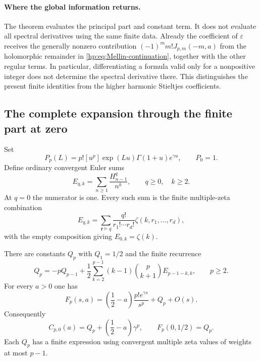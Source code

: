 \paragraph{Where the global information returns.}
The theorem evaluates the principal part and constant term. It does
not evaluate all spectral derivatives using the same finite data.
Already the coefficient of $\varepsilon$ receives the generally nonzero
contribution $(-1)^m m!J_{p,m}(-m,a)$ from the holomorphic remainder
in \eqref{hp:eq:Mellin-continuation}, together with the other regular
terms. In particular, differentiating a formula valid only for a
nonpositive integer does not determine the spectral derivative there.
This distinguishes the present finite identities from the higher
harmonic Stieltjes coefficients.

\subsection{The complete expansion through the finite part at zero}

Set
\begin{equation}\label{hp:def:P}
 P_p(L)=p![u^p]\exp(Lu)\Gamma(1+u)e^{\gamma u},\qquad P_0=1.
\end{equation}
Define ordinary convergent Euler sums
\begin{equation}\label{hp:def:E}
 E_{q,k}=\sum_{n\ge1}\frac{H_{n-1}^q}{n^k},
 \qquad q\ge0,\quad k\ge2.
\end{equation}
At $q=0$ the numerator is one. Every such sum is the finite
multiple-zeta combination
\begin{equation}\label{hp:eq:E-MZV}
 E_{q,k}=\sum_{\boldsymbol{r}\vDash q}
       \frac{q!}{r_1!\cdots r_d!}\zeta(k,r_1,\ldots,r_d),
\end{equation}
with the empty composition giving $E_{0,k}=\zeta(k)$.

\begin{theorem}
\label{hp:thm:zero}
There are constants $Q_p$ with $Q_1=1/2$ and the finite recurrence
\begin{equation}\label{hp:eq:Q-recurrence}
 Q_p=-pQ_{p-1}+
 \frac12\sum_{k=2}^{p-1}(k-1)\binom p{k+1}E_{p-1-k,k},
                       \qquad p\ge2.
\end{equation}
For every $a>0$ one has
\begin{equation}\label{hp:eq:zero-expansion}
 \boxed{\quad F_p(s,a)=
   \left(\frac12-a\right)\frac{p!e^{\gamma s}}{s^p}
                 +Q_p+O(s).\quad}
\end{equation}
Consequently
\begin{equation}\label{hp:eq:zero-FP}
 C_{p,0}(a)=Q_p+\left(\frac12-a\right)\gamma^p,
                  \qquad F_p(0,1/2)=Q_p.
\end{equation}
Each $Q_p$ has a finite expression using convergent multiple zeta
values of weights at most $p-1$.
\end{theorem}

